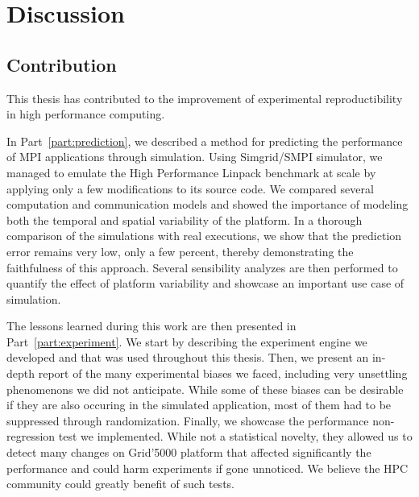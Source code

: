 \chapter{Discussion}
\label{chapter:conclusion}


    \section{Contribution}%

        This thesis has contributed to the improvement of experimental reproductibility in high performance computing.

        In Part~\ref{part:prediction}, we described a method for predicting the performance of MPI applications through
        simulation. Using Simgrid/SMPI simulator, we managed to emulate the High Performance Linpack benchmark at scale
        by applying only a few modifications to its source code. We compared several computation and communication
        models and showed the importance of modeling both the temporal and spatial variability of the platform. In a
        thorough comparison of the simulations with real executions, we show that the prediction error remains very low,
        only a few percent, thereby demonstrating the faithfulness of this approach. Several sensibility analyzes are
        then performed to quantify the effect of platform variability and showcase an important use case of simulation.

        The lessons learned during this work are then presented in Part~\ref{part:experiment}. We start by describing the
        experiment engine we developed and that was used throughout this thesis. Then, we present an in-depth report of
        the many experimental biases we faced, including very unsettling phenomenons we did not anticipate. While some
        of these biases can be desirable if they are also occuring in the simulated application, most of them had to be
        suppressed through randomization. Finally, we showcase the performance non-regression test we implemented. While
        not a statistical novelty, they allowed us to detect many changes on Grid'5000 platform that affected
        significantly the performance and could harm experiments if gone unnoticed. We believe the HPC community could
        greatly benefit of such tests.

